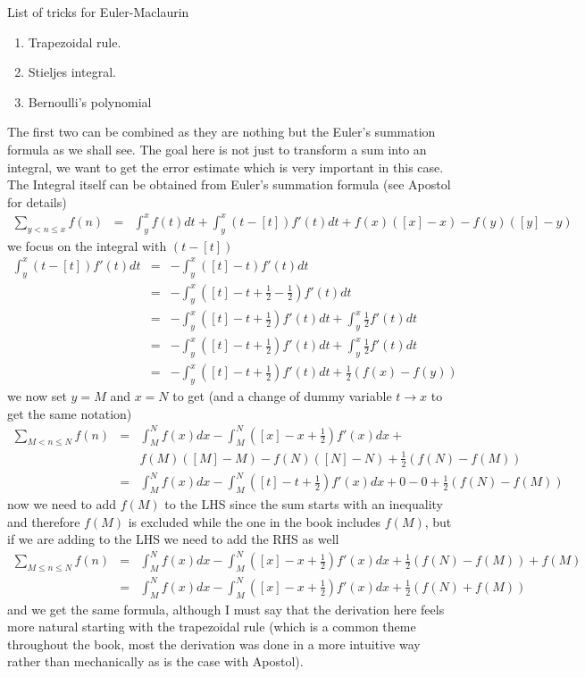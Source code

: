 \documentclass[aps,preprint,preprintnumbers,nofootinbib,showpacs,prd]{revtex4-1}
\newcommand{\nbea}{\begin{eqnarray*}}
\newcommand{\neea}{\end{eqnarray*}}
\begin{document}
List of tricks for Euler-Maclaurin
%
\begin{enumerate}
\item Trapezoidal rule.
%
\item Stieljes integral.
%
\item Bernoulli's polynomial
\end{enumerate}
%
The first two can be combined as they are nothing but the Euler's summation formula as we shall see. The goal here is not just to transform a sum into an integral, we want to get the error estimate which is very important in this case. The Integral itself can be obtained from Euler's summation formula (see Apostol for details)
%
\nbea
\sum_{y < n \le x} f(n) & = & \int_y^x f(t) dt + \int_y^x (t - [t]) f'(t) dt + f(x)([x] - x) - f(y)([y] - y)
\neea
%
we focus on the integral with $(t-[t])$
%
\nbea
\int_y^x (t - [t]) f'(t) dt & = & -\int_y^x ([t] - t) f'(t) dt \\
& = & -\int_y^x ([t] - t + \frac{1}{2} - \frac{1}{2}) f'(t) dt \\
& = & -\int_y^x ([t] - t + \frac{1}{2}) f'(t) dt  + \int_y^x \frac{1}{2} f'(t) dt \\
& = & -\int_y^x ([t] - t + \frac{1}{2}) f'(t) dt  + \int_y^x \frac{1}{2} f'(t) dt \\
& = & -\int_y^x ([t] - t + \frac{1}{2}) f'(t) dt  + \frac{1}{2} (f(x) - f(y))
\neea
%
we now set $y = M$ and $x = N$ to get (and a change of dummy variable $t \to x$ to get the same notation)
%
\nbea
\sum_{M < n \le N} f(n) & = & \int_M^N f(x) dx - \int_M^N ([x] - x + \frac{1}{2}) f'(x) dx + \\
&& f(M)([M] - M) - f(N)([N] - N) + \frac{1}{2} (f(N) - f(M)) \\
& = & \int_M^N f(x) dx - \int_M^N ([t] - t + \frac{1}{2}) f'(x) dx  + 0 - 0 + \frac{1}{2} (f(N) - f(M))
\neea
%
now we need to add $f(M)$ to the LHS since the sum starts with an inequality and therefore $f(M)$ is excluded while the one in the book includes $f(M)$, but if we are adding to the LHS we need to add the RHS as well
%
\nbea
\sum_{M \le n \le N} f(n) & = & \int_M^N f(x) dx - \int_M^N ([x] - x + \frac{1}{2}) f'(x) dx  + \frac{1}{2} (f(N) - f(M)) + f(M) \\
& = & \int_M^N f(x) dx - \int_M^N ([x] - x + \frac{1}{2}) f'(x) dx + \frac{1}{2} (f(N) + f(M))
\neea
%
and we get the same formula, although I must say that the derivation here feels more natural starting with the trapezoidal rule (which is a common theme throughout the book, most the derivation was done in a more intuitive way rather than mechanically as is the case with Apostol).
\end{document}

